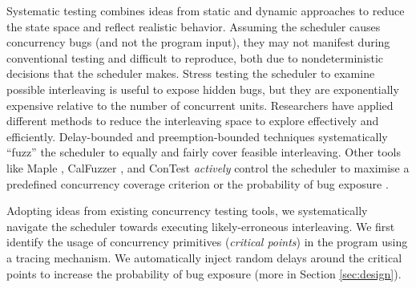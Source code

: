%

Systematic testing combines ideas from static and dynamic approaches to reduce the state space and reflect realistic behavior.
%
Assuming the scheduler causes concurrency bugs (and not the program input), they may not manifest during conventional testing and difficult to reproduce, both due to nondeterministic decisions that the scheduler makes.
%
Stress testing the scheduler to examine possible interleaving is useful to expose hidden bugs, but they are exponentially expensive relative to the number of concurrent units.
%
Researchers have applied different methods \cite{thomson-concurrencyTesting-ppopp14} to reduce the interleaving space to explore effectively and efficiently.
%
Delay-bounded \cite{emmi-delayBounded-popl11,burckhardt-depthBug-asplos10} and preemption-bounded \cite{madanlal-preemptionBound-pldi07} techniques systematically ``fuzz'' the scheduler to equally and fairly cover feasible interleaving.
%
Other tools like Maple \cite{yu-maple-oopsla12}, CalFuzzer \cite{joshi-calfuzzer},  and ConTest \cite{contest-jgi01,edelstein2003contest} \textit{actively} control the scheduler to maximise a predefined concurrency coverage criterion \cite{hong-syncTesting-issta12} or the probability of bug exposure \cite{burckhardt-depthBug-asplos10}.

Adopting ideas from existing concurrency testing tools, we systematically navigate the scheduler towards executing likely-erroneous interleaving.
%
We first identify the usage of concurrency primitives (\textit{critical points}) in the program using a tracing mechanism.
%
We automatically inject random delays around the critical points to increase the probability of bug exposure (more in Section \ref{sec:design}).
